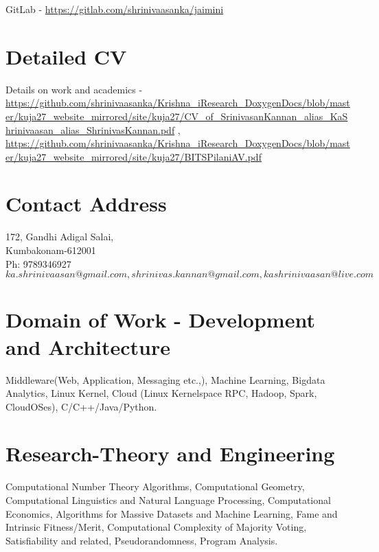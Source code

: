 \documentclass[11pt,onecolumn]{article}
\begin{document}
GitLab - \url {https://gitlab.com/shrinivaasanka/jaimini}

\section{Detailed CV}
Details on work and academics - \url {https://github.com/shrinivaasanka/Krishna_iResearch_DoxygenDocs/blob/master/kuja27_website_mirrored/site/kuja27/CV\_of\_SrinivasanKannan\_alias\_KaShrinivaasan\_alias\_ShrinivasKannan.pdf} , \url {https://github.com/shrinivaasanka/Krishna_iResearch_DoxygenDocs/blob/master/kuja27_website_mirrored/site/kuja27/BITSPilaniAV.pdf}

\section{Contact Address}
172, Gandhi Adigal Salai, \\
Kumbakonam-612001 \\
Ph: 9789346927 \\
$ka.shrinivaasan@gmail.com, shrinivas.kannan@gmail.com, kashrinivaasan@live.com$ 

\section{Domain of Work - Development and Architecture}
Middleware(Web, Application, Messaging etc.,), Machine Learning, Bigdata Analytics, Linux Kernel, Cloud (Linux Kernelspace RPC, Hadoop, Spark, CloudOSes), C/C++/Java/Python.

\section{Research-Theory and Engineering}
Computational Number Theory Algorithms, Computational Geometry, Computational Linguistics and Natural Language Processing, Computational Economics, Algorithms for Massive Datasets and Machine Learning, Fame and Intrinsic Fitness/Merit, Computational Complexity of Majority Voting, Satisfiability and related, Pseudorandomness, Program Analysis.
\end{document}
